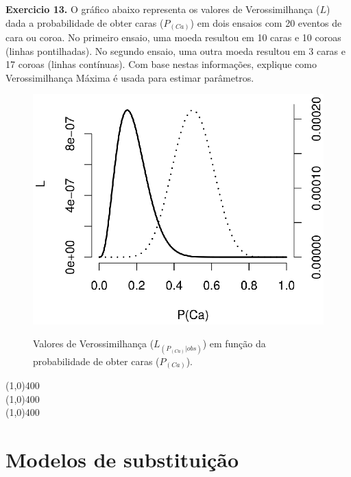 \begin{refsection}
\begin{blackBlock}{\textbf{Exercicio 13.}}
O gráfico abaixo representa os valores de Verossimilhança ($L$) dada a probabilidade de obter caras ($P_{(Ca)}$) em dois ensaios com 20 eventos de cara ou coroa. No primeiro ensaio, uma moeda resultou em 10 caras e 10 coroas (linhas pontilhadas). No segundo ensaio, uma outra moeda resultou em 3 caras e 17 coroas (linhas contínuas). Com base nestas informações, explique como Verossimilhança Máxima é usada para estimar parâmetros.

\end{blackBlock}

  \begin{figure}[h!]
      {\includegraphics[scale=0.8]{figures/tut12/plot_coins.eps}}
      {\caption{Valores de Verossimilhança ($L_{(P_{(Ca)}|obs)}$) em função da probabilidade de obter caras ($P_{(Ca)}$).}\label{fig:plot_coin}}
  \end{figure}



\begin{center}
\line(1,0){400}\\
\line(1,0){400}\\
\line(1,0){400}\\
\end{center}



\section{Modelos de substituição}\label{tut12:mod}


\end{refsection}
